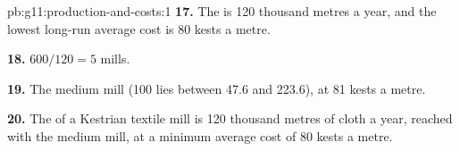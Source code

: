 \begin{solution}{pb:g11:production-and-costs:1}
\textbf{17.} The  is 120 thousand metres a year, and the lowest long-run average cost is 80 kests a metre.

\textbf{18.} $600/120 = 5$ mills.

\textbf{19.} The medium mill (100 lies between 47.6 and 223.6), at 81 kests a metre.

\textbf{20.} The  of a Kestrian textile mill is 120 thousand metres of cloth a year, reached with the medium mill, at a minimum average cost of 80 kests a
metre.
\end{solution}
